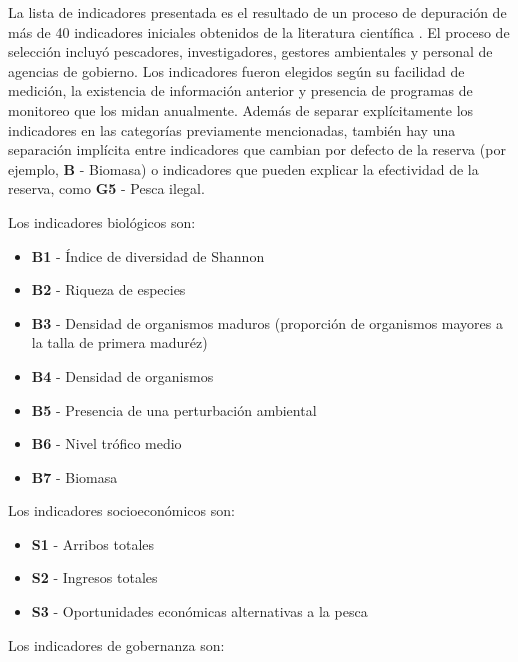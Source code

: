 \documentclass[]{krantz}
\providecommand{\tightlist}{%
  \setlength{\itemsep}{0pt}\setlength{\parskip}{0pt}}
\begin{document}
La lista de indicadores presentada es el resultado de un proceso de depuración de más de 40 indicadores iniciales obtenidos de la literatura científica \citep{halpern_2002, lester_2009, lester_2008, micheli_2012, halpern_2013, basurto_2013, leslie_2015}. El proceso de selección incluyó pescadores, investigadores, gestores ambientales y personal de agencias de gobierno. Los indicadores fueron elegidos según su facilidad de medición, la existencia de información anterior y presencia de programas de monitoreo que los midan anualmente. Además de separar explícitamente los indicadores en las categorías previamente mencionadas, también hay una separación implícita entre indicadores que cambian por defecto de la reserva (por ejemplo, \textbf{B} - Biomasa) o indicadores que pueden explicar la efectividad de la reserva, como \textbf{G5} - Pesca ilegal.

Los indicadores biológicos son:

\begin{itemize}
\tightlist
\item
  \textbf{B1} - Índice de diversidad de Shannon
\item
  \textbf{B2} - Riqueza de especies
\item
  \textbf{B3} - Densidad de organismos maduros (proporción de organismos mayores a la talla de primera maduréz)
\item
  \textbf{B4} - Densidad de organismos
\item
  \textbf{B5} - Presencia de una perturbación ambiental
\item
  \textbf{B6} - Nivel trófico medio
\item
  \textbf{B7} - Biomasa
\end{itemize}

Los indicadores socioeconómicos son:

\begin{itemize}
\tightlist
\item
  \textbf{S1} - Arribos totales
\item
  \textbf{S2} - Ingresos totales
\item
  \textbf{S3} - Oportunidades económicas alternativas a la pesca
\end{itemize}

Los indicadores de gobernanza son:
\end{document}
